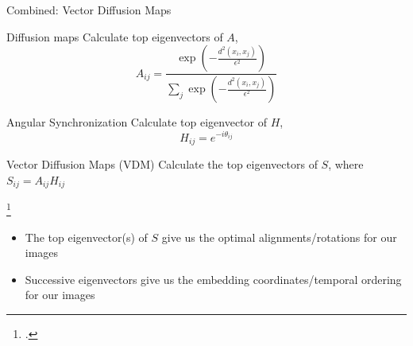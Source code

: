\documentclass[10pt]{beamer}
\begin{document}
\begin{frame}{Combined: Vector Diffusion Maps}

\begin{minipage}{0.45\textwidth}
	\begin{block}{Diffusion maps}
		Calculate top eigenvectors of $A$, 
		$$A_{ij} = \frac{\exp \left(-\frac{d^2(x_i, x_j)}{\epsilon^2}\right)}{\sum_j \exp \left(-\frac{d^2(x_i, x_j)}{\epsilon^2}\right)} $$
	\end{block}
	\end{minipage}	
	\hfill
	\begin{minipage}{0.45\textwidth}	
	\begin{block}{Angular Synchronization}
		Calculate top eigenvector of $H$,  
		$$H_{ij} = e^{-i \theta_{ij}}$$
	\end{block}
	\end{minipage}
	
	\begin{block}{Vector Diffusion Maps (VDM) \footnotemark} 
		Calculate the top eigenvectors of $S$, where $S_{ij} = A_{ij}H_{ij}$
		
	\end{block}
	\footcitetext{singer2012vector}

\begin{itemize}
\item The top eigenvector(s) of $S$ give us the optimal alignments/rotations for our images
\item Successive eigenvectors give us the embedding coordinates/temporal ordering for our images
\end{itemize}

\end{frame}
\end{document}

